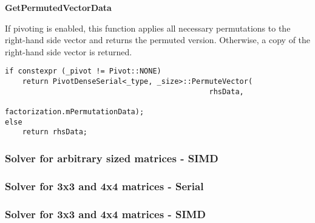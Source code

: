 \vspace{1cm}
\textbf{GetPermutedVectorData}
\vspace{0.5cm}

If pivoting is enabled, this function applies all necessary permutations to the right-hand side vector and returns the permuted version.
Otherwise, a copy of the right-hand side vector is returned.

\begin{verbatim}
if constexpr (_pivot != Pivot::NONE)
    return PivotDenseSerial<_type, _size>::PermuteVector(
                                               rhsData, 
                                               factorization.mPermutationData);
else
    return rhsData;
\end{verbatim}

\newpage
\subsubsection{Solver for arbitrary sized matrices - SIMD}
\subsubsection{Solver for 3x3 and 4x4 matrices - Serial}
\subsubsection{Solver for 3x3 and 4x4 matrices - SIMD}